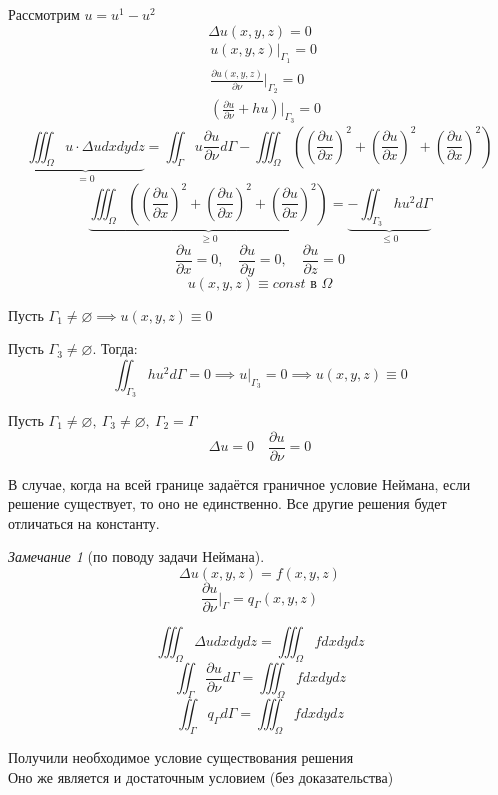 \documentclass[a4paper]{article}
\theoremstyle{definition}
\theoremstyle{remark}
\newtheorem*{remark}{Замечание}
\begin{document}
Рассмотрим $ u = u^1 - u^2 $ 
\begin{equation}
    \Delta u(x,y,z) = 0
\end{equation}
\begin{subequations}
    \begin{align}
            &u(x,y,z) |_{\Gamma_1} = 0\\
            &\frac{\partial u(x,y,z)}{\partial \nu} \bigg|_{\Gamma_2} = 0\\
            &\left( \frac{\partial u}{\partial \nu} + hu \right)\bigg|_{\Gamma_3} = 0
    \end{align}
\end{subequations}
\[
    \underbrace{\iiint_{\Omega} u \cdot \Delta u dxdydz}_{=0} = \iint_{\Gamma}u \frac{\partial u}{\partial \nu} 
    d\Gamma - \iiint_{\Omega} \left( \left( \frac{\partial u}{\partial x} \right)^2
    + \left( \frac{\partial u}{\partial x} \right)^2 + 
\left( \frac{\partial u}{\partial x} \right)^2\right)
\]
\[
    \underbrace{\iiint_{\Omega} \left( \left( \frac{\partial u}{\partial x} \right)^2
    + \left( \frac{\partial u}{\partial x} \right)^2 + 
\left( \frac{\partial u}{\partial x} \right)^2\right)}_{\geq 0} = 
\underbrace{-\iint_{\Gamma_3}h u^2 d\Gamma}_{\leq 0}
\]
\[
    \frac{\partial u}{\partial x} = 0, \quad 
    \frac{\partial u}{\partial y} = 0, \quad
    \frac{\partial u}{\partial z} = 0
\]
\[
    u(x,y,z) \equiv const \text{ в } \Omega 
\]

Пусть $ \Gamma_1 \neq \varnothing \implies u(x,y,z) \equiv 0 $ 

Пусть $ \Gamma_3 \neq \varnothing $. Тогда: 
\[
    \iint_{\Gamma_3} h u^2 d\Gamma = 0 \implies u|_{\Gamma_3} = 0 \implies
    u(x,y,z) \equiv 0
\]

Пусть $ \Gamma_1 \neq \varnothing, \ \Gamma_3 \neq \varnothing, \ \Gamma_2 = \Gamma $ 
\[
    \Delta u = 0 \quad \frac{\partial u}{\partial \nu} = 0
\]

В случае, когда на всей границе задаётся граничное условие Неймана, если
решение существует, то оно не единственно. Все другие решения будет отличаться
на константу.

\begin{tcolorbox}
    \begin{remark}[по поводу задачи Неймана]
        \[
            \Delta u(x,y,z) = f(x,y,z)
        \]
        \[
            \frac{\partial u}{\partial \nu} \bigg|_{\Gamma} = q_{\Gamma}(x,y,z)
        \]

        \[
            \iiint_{\Omega} \Delta u dxdydz = \iiint_{\Omega} f dxdydz
        \]
        \[
            \iint_{\Gamma} \frac{\partial u}{\partial \nu} d\Gamma = 
            \iiint_{\Omega} f dxdydz
        \]
        \[
            \iint_{\Gamma} q_{\Gamma} d\Gamma = 
            \iiint_{\Omega} f dxdydz
        \]

        Получили необходимое условие существования решения\\
        Оно же является и достаточным условием (без доказательства)
    \end{remark}
\end{tcolorbox}
\end{document}
